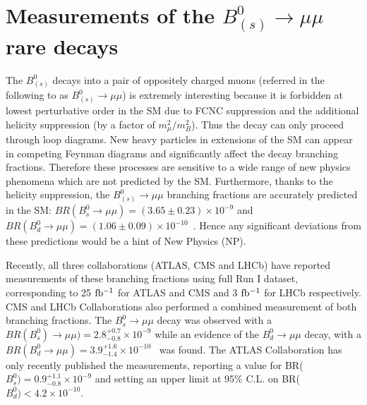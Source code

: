 %
%
%
%
%
%
%
%
%
\section{Measurements of the $B^0_{(s)} \to \mu\mu$ rare decays}
The $B^0_{(s)}$ decays into a pair of oppositely charged muons (referred in the following to as $B^0_{(s)} \to \mu\mu$) is extremely interesting because it is forbidden at lowest perturbative order in the SM due to FCNC suppression and the additional helicity suppression (by a factor of $m^2_{\mu}/m^2_B$). Thus the decay can only proceed through loop diagrams. New heavy particles in extensions of the SM can appear in competing Feynman diagrams and significantly affect the decay branching fractions. Therefore these processes are sensitive to a wide range of new physics phenomena which are not predicted by the SM. Furthermore, thanks to the helicity suppression, the $B^0_{(s)} \to \mu\mu$ branching fractions are accurately predicted in the SM: $BR(B^0_s \to \mu\mu) = (3.65 \pm 0.23) \times 10^{-9}$ and $BR(B^0_d \to \mu\mu) = (1.06 \pm 0.09) \times 10^{-10}$~\cite{Bobeth}. Hence any significant deviations from these predictions would be a hint of New Physics (NP).

Recently, all three collaborations (ATLAS,  CMS and LHCb) have reported measurements of these branching fractions using full Run I dataset, corresponding to 25 $\rm{fb^{-1}}$ for ATLAS and CMS and 3 $\rm{fb^{-1}}$ for LHCb respectively. CMS and LHCb Collaborations also performed a combined measurement of both branching fractions. The $B^0_s \to \mu\mu$ decay was observed with a $BR(B^0_s) \to \mu\mu) = 2.8^{+0.7}_{-0.8} \times 10^{-9}$ while an evidence of the  $B^0_d \to \mu\mu$ decay, with a  $BR(B^0_d \to \mu\mu) = 3.9^{+1.6}_{-1.4} \times 10^{-10}$~\cite{Nature} was found.
The ATLAS Collaboration has only recently published the measurements, reporting a value for BR($B^0_s) = 0.9^{+1.1}_{-0.8}\times 10^{-9}$ and setting an upper limit at 95\% C.L. on  BR($B^0_d) < 4.2 \times 10^{-10}$.~\cite{ATLAS_Bmumu}

